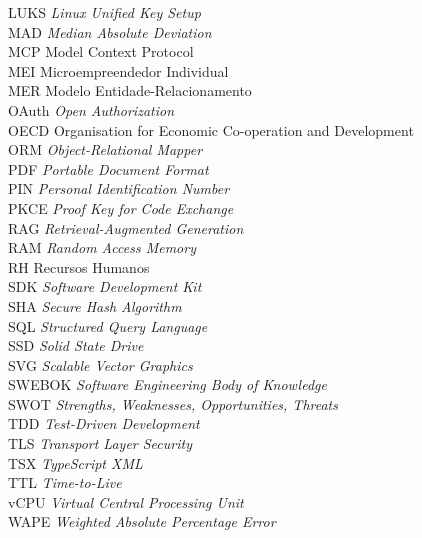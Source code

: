 \begin{tabbing}
    LUKS \> \textit{Linux Unified Key Setup}\\
    MAD \> \textit{Median Absolute Deviation}\\
    MCP \> Model Context Protocol\\
    MEI \> Microempreendedor Individual\\
    MER \> Modelo Entidade-Relacionamento\\
    OAuth \> \textit{Open Authorization}\\
    OECD \> Organisation for Economic Co-operation and Development\\
    ORM \> \textit{Object-Relational Mapper}\\
    PDF \> \textit{Portable Document Format}\\
    PIN \> \textit{Personal Identification Number}\\
    PKCE \> \textit{Proof Key for Code Exchange}\\
    RAG \> \textit{Retrieval-Augmented Generation}\\
    RAM \> \textit{Random Access Memory}\\
    RH \> Recursos Humanos\\
    SDK \> \textit{Software Development Kit}\\
    SHA \> \textit{Secure Hash Algorithm}\\
    SQL \> \textit{Structured Query Language}\\
    SSD \> \textit{Solid State Drive}\\
    SVG \> \textit{Scalable Vector Graphics}\\
    SWEBOK \> \textit{Software Engineering Body of Knowledge}\\
    SWOT \> \textit{Strengths, Weaknesses, Opportunities, Threats}\\
    TDD \> \textit{Test-Driven Development}\\
    TLS \> \textit{Transport Layer Security}\\
    TSX \> \textit{TypeScript XML}\\
    TTL \> \textit{Time-to-Live}\\
    vCPU \> \textit{Virtual Central Processing Unit}\\
    WAPE \> \textit{Weighted Absolute Percentage Error}\\
\end{tabbing}

\newpage
{}
\printlist{\tableofcontents}
